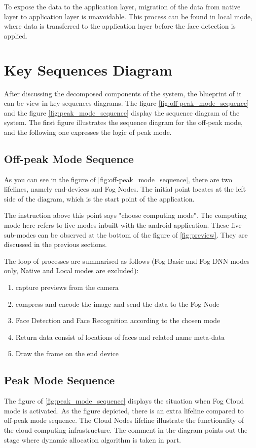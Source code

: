 To expose the data to the application layer, migration of the data from native layer to application layer is unavoidable. This process can be found in local mode, where data is transferred to the application layer before the face detection is applied.

\section{Key Sequences Diagram}
After discussing the decomposed components of the system, the blueprint of it can be view in key sequences diagrams.
The figure \ref{fig:off-peak_mode_sequence} and the figure \ref{fig:peak_mode_sequence} display the sequence diagram of the system. The first figure illustrates the sequence diagram for the off-peak mode, and the following one expresses the logic of peak mode.

\subsection{Off-peak Mode Sequence}
As you can see in the figure of \ref{fig:off-peak_mode_sequence}, there are two lifelines, namely end-devices and Fog Nodes. The initial point locates at the left side of the diagram, which is the start point of the application.

The instruction above this point says "choose computing mode". The computing mode here refers to five modes inbuilt with the android application. These five sub-modes can be observed at the bottom of the figure of \ref{fig:preview}. They are discussed in the previous sections.

The loop of processes are summarised as follows (Fog Basic and Fog DNN modes only, Native and Local modes are excluded):
\begin{enumerate}
    \item capture previews from the camera
    \item compress and encode the image and send the data to the Fog Node
    \item Face Detection and Face Recognition according to the chosen mode
    \item Return data consist of locations of faces and related name meta-data
    \item Draw the frame on the end device
\end{enumerate}

\subsection{Peak Mode Sequence}
The figure of \ref{fig:peak_mode_sequence} displays the situation when Fog Cloud mode is activated. As the figure depicted, there is an extra lifeline compared to off-peak mode sequence. The Cloud Nodes lifeline illustrate the functionality of the cloud computing infrastructure. The comment in the diagram points out the stage where dynamic allocation algorithm is taken in part.

